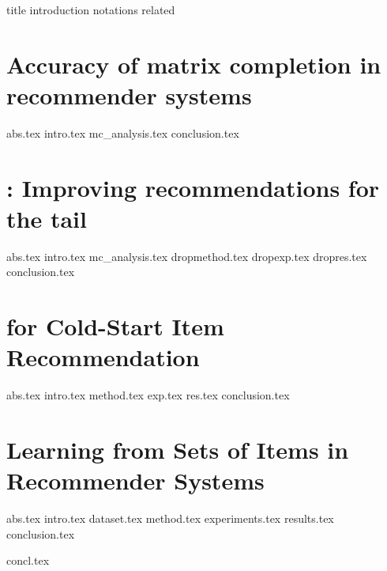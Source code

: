 \documentclass[11pt,oneside]{mnthesis}
\begin{document}
  
  
 
    {title}
    {introduction}
    {notations}
    {related}
    
    \chapter {Accuracy of matrix completion in recommender systems}  \label{ch:matcomp}
    {abs.tex}
    {intro.tex}
    {mc_analysis.tex}
    {conclusion.tex}
    
    
    \chapter{\TMF: Improving recommendations for the tail} \label{ch:tmf}
    {abs.tex}
    {intro.tex}
    {mc_analysis.tex}
    {dropmethod.tex}
    {dropexp.tex}
    {dropres.tex}
    {conclusion.tex}

      
    \chapter {\CFEXP for Cold-Start \TOPN Item Recommendation} \label{ch:bilinear}
    {abs.tex}
    {intro.tex}
    {method.tex}
    {exp.tex}
    {res.tex}
    {conclusion.tex}
    
    
    
    \chapter{Learning from Sets of Items in Recommender Systems} \label{ch:lfs}
    {abs.tex}
    {intro.tex}
    {dataset.tex}
    {method.tex}
    {experiments.tex}
    {results.tex}
    {conclusion.tex}


    {concl.tex}


  
  
\end{document}
